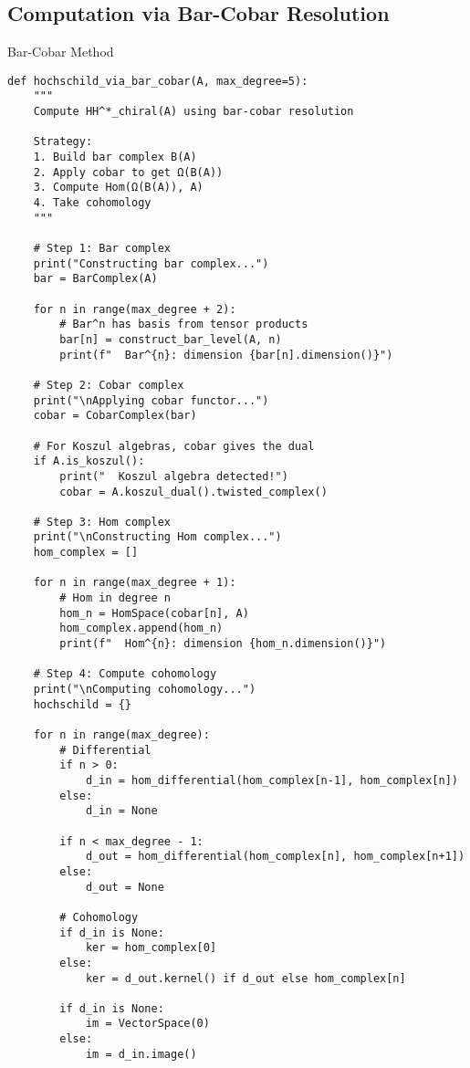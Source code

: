 \subsection{Computation via Bar-Cobar Resolution}

\begin{algorithm}
\caption{Bar-Cobar Method}
\begin{verbatim}
def hochschild_via_bar_cobar(A, max_degree=5):
    """
    Compute HH^*_chiral(A) using bar-cobar resolution
    
    Strategy:
    1. Build bar complex B(A)
    2. Apply cobar to get Ω(B(A))  
    3. Compute Hom(Ω(B(A)), A)
    4. Take cohomology
    """
    
    # Step 1: Bar complex
    print("Constructing bar complex...")
    bar = BarComplex(A)
    
    for n in range(max_degree + 2):
        # Bar^n has basis from tensor products
        bar[n] = construct_bar_level(A, n)
        print(f"  Bar^{n}: dimension {bar[n].dimension()}")
    
    # Step 2: Cobar complex
    print("\nApplying cobar functor...")
    cobar = CobarComplex(bar)
    
    # For Koszul algebras, cobar gives the dual
    if A.is_koszul():
        print("  Koszul algebra detected!")
        cobar = A.koszul_dual().twisted_complex()
    
    # Step 3: Hom complex
    print("\nConstructing Hom complex...")
    hom_complex = []
    
    for n in range(max_degree + 1):
        # Hom in degree n
        hom_n = HomSpace(cobar[n], A)
        hom_complex.append(hom_n)
        print(f"  Hom^{n}: dimension {hom_n.dimension()}")
    
    # Step 4: Compute cohomology
    print("\nComputing cohomology...")
    hochschild = {}
    
    for n in range(max_degree):
        # Differential
        if n > 0:
            d_in = hom_differential(hom_complex[n-1], hom_complex[n])
        else:
            d_in = None
            
        if n < max_degree - 1:
            d_out = hom_differential(hom_complex[n], hom_complex[n+1])
        else:
            d_out = None
        
        # Cohomology
        if d_in is None:
            ker = hom_complex[0]
        else:
            ker = d_out.kernel() if d_out else hom_complex[n]
            
        if d_in is None:
            im = VectorSpace(0)
        else:
            im = d_in.image()
        

\end{verbatim}
\end{algorithm}
